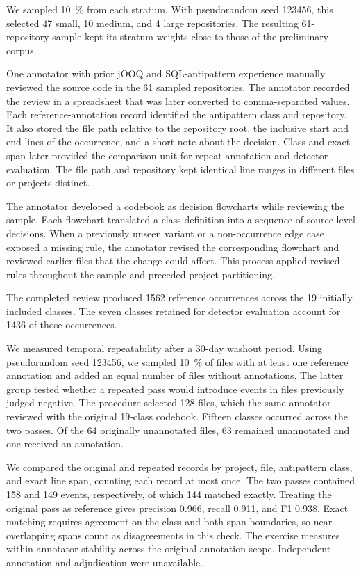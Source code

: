 We sampled \qty{10}{\percent} from each stratum. With pseudorandom seed \num{123456}, this selected \num{47} small, \num{10} medium, and \num{4} large repositories. The resulting \num{61}-repository sample kept its stratum weights close to those of the preliminary corpus.\label{sec:sampleGeneration}

One annotator with prior jOOQ and SQL-antipattern experience manually reviewed the source code in the \num{61} sampled repositories. The annotator recorded the review in a spreadsheet that was later converted to comma-separated values. Each reference-annotation record identified the antipattern class and repository. It also stored the file path relative to the repository root, the inclusive start and end lines of the occurrence, and a short note about the decision. Class and exact span later provided the comparison unit for repeat annotation and detector evaluation. The file path and repository kept identical line ranges in different files or projects distinct.

The annotator developed a codebook as decision flowcharts while reviewing the sample. Each flowchart translated a class definition into a sequence of source-level decisions. When a previously unseen variant or a non-occurrence edge case exposed a missing rule, the annotator revised the corresponding flowchart and reviewed earlier files that the change could affect. This process applied revised rules throughout the sample and preceded project partitioning.

The completed review produced \num{1562} reference occurrences across the 19 initially included classes. The seven classes retained for detector evaluation account for \num{1436} of those occurrences.

We measured temporal repeatability after a 30-day washout period. Using pseudorandom seed \num{123456}, we sampled \qty{10}{\percent} of files with at least one reference annotation and added an equal number of files without annotations. The latter group tested whether a repeated pass would introduce events in files previously judged negative. The procedure selected \num{128} files, which the same annotator reviewed with the original 19-class codebook. Fifteen classes occurred across the two passes. Of the \num{64} originally unannotated files, \num{63} remained unannotated and one received an annotation.

We compared the original and repeated records by project, file, antipattern class, and exact line span, counting each record at most once. The two passes contained \num{158} and \num{149} events, respectively, of which \num{144} matched exactly. Treating the original pass as reference gives precision \num{0.966}, recall \num{0.911}, and F1 \num{0.938}. Exact matching requires agreement on the class and both span boundaries, so near-overlapping spans count as disagreements in this check. The exercise measures within-annotator stability across the original annotation scope. Independent annotation and adjudication were unavailable.

